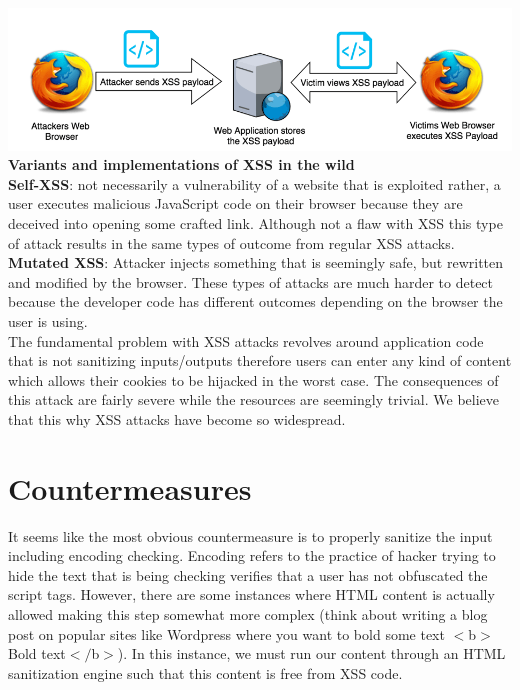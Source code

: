 \documentclass[11pt]{article}
\begin{document}
\includegraphics[width = 15cm]{stored-xss-diagram-example.png}\\

\textbf{Variants and implementations of XSS in the wild}\\

\textbf{Self-XSS}: not necessarily a vulnerability of a website that is exploited rather, a user executes malicious JavaScript code on their browser because they are deceived into opening some crafted link. Although not a flaw with XSS this type of attack results in the same types of outcome from regular XSS attacks.\\

\textbf{Mutated XSS}: Attacker injects something that is seemingly safe, but rewritten and modified by the browser. These types of attacks are much harder to detect because the developer code has different outcomes depending on the browser the user is using.\\ 

The fundamental problem with XSS attacks revolves around application code that is not sanitizing inputs/outputs therefore users can enter any kind of content which allows their cookies to be hijacked in the worst case. The consequences of this attack are fairly severe while the resources are seemingly trivial. We believe that this why XSS attacks have become so widespread. \\

\section{Countermeasures}\newline

It seems like the most obvious countermeasure is to properly sanitize the input including encoding checking. Encoding refers to the practice of hacker trying to hide the text that is being checking verifies that a user has not obfuscated the script tags. However, there are some instances where HTML content is actually allowed making this step somewhat more complex (think about writing a blog post on popular sites like Wordpress where you want to bold some text $<$b$>$ Bold text$</$b$>$). In this instance, we must run our content through an HTML sanitization engine such that this content is free from XSS code.\\
\end{document}

